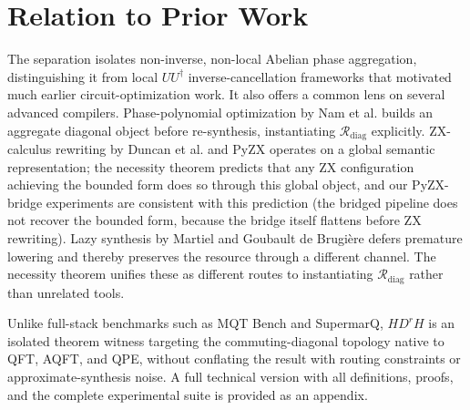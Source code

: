 \documentclass[a4paper]{article}
\begin{document}
\section{Relation to Prior Work}

The separation isolates non-inverse, non-local Abelian phase aggregation, distinguishing it from
local $UU^\dagger$ inverse-cancellation frameworks that motivated much earlier circuit-optimization
work. It also offers a common lens on several advanced compilers. Phase-polynomial optimization by
Nam et al. builds an aggregate diagonal object before re-synthesis, instantiating
$\mathcal{R}_{\mathrm{diag}}$ explicitly. ZX-calculus rewriting by Duncan et al. and PyZX operates on
a global semantic representation; the necessity theorem predicts that any ZX configuration achieving
the bounded form does so through this global object, and our PyZX-bridge experiments are consistent
with this prediction (the bridged pipeline does not recover the bounded form, because the bridge
itself flattens before ZX rewriting). Lazy synthesis by Martiel and Goubault de Brugi\`ere defers
premature lowering and thereby preserves the resource through a different channel. The necessity
theorem unifies these as different routes to instantiating $\mathcal{R}_{\mathrm{diag}}$ rather than
unrelated tools.

Unlike full-stack benchmarks such as MQT Bench and SupermarQ, $HD^rH$ is an isolated theorem witness
targeting the commuting-diagonal topology native to QFT, AQFT, and QPE, without conflating the
result with routing constraints or approximate-synthesis noise. A full technical version with all
definitions, proofs, and the complete experimental suite is provided as an appendix.
\end{document}
